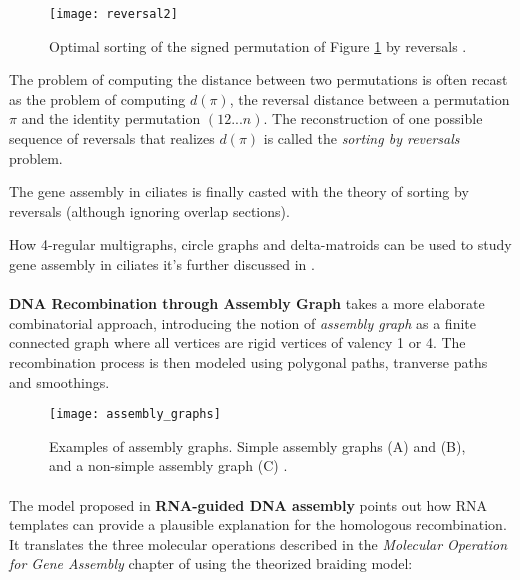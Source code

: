 \begin{figure}[h]
  \centering
    \texttt{[image: reversal2]}
  \caption{Optimal sorting of the signed permutation of Figure \ref{fig:reversal1} by reversals \cite{DBLP:journals/corr/Brijder17}.}

\end{figure}

The problem of computing the distance between two permutations is often recast as the problem of computing $d(\pi)$, the reversal distance between a permutation $\pi$ and the identity permutation $(1 2 ... n)$. The reconstruction of one possible sequence of reversals that realizes $d(\pi)$ is called the \textit{sorting by reversals} problem.

The gene assembly in ciliates is finally casted with the theory of sorting by reversals (although ignoring overlap sections).

How 4-regular multigraphs, circle graphs and delta-matroids can be used to study gene assembly in ciliates it's further discussed in \cite{Brijder2014}.

\clearpage
\paragraph{}
\textbf{DNA Recombination through Assembly Graph}\cite{ANGELESKA20093020} takes a more elaborate combinatorial approach, introducing the notion of \textit{assembly graph} as a finite connected graph where all vertices are rigid vertices of valency 1 or 4. The recombination process is then modeled using polygonal paths, tranverse paths and smoothings.
\begin{figure}[h]
  \centering
    \texttt{[image: assembly\_graphs]}
  \caption{ Examples of assembly graphs. Simple assembly graphs (A) and (B), and a non-simple assembly graph (C) \cite{ANGELESKA20093020}.}
  \label{fig:reversal1}
\end{figure}

\paragraph{}

The model proposed in \textbf{RNA-guided DNA assembly} \cite{ANGELESKA2007706} points out how RNA templates can provide a plausible explanation for the homologous recombination. It translates the three molecular operations described in the \textit{Molecular Operation for Gene Assembly} chapter of \cite{Ehrenfeucht:2004:CLC:971120} using the theorized braiding model:

